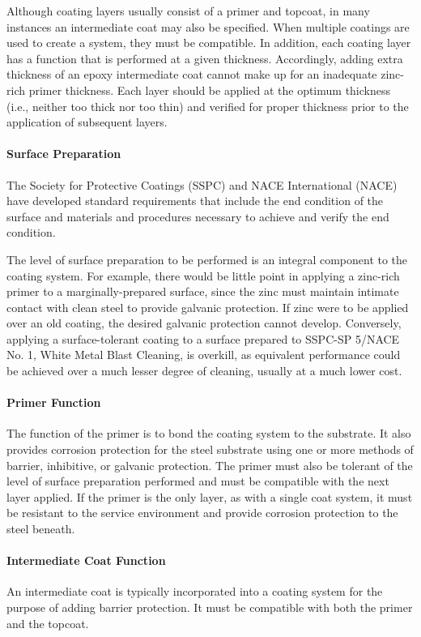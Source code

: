 Although coating layers usually consist of a primer and topcoat, in many instances an intermediate coat may also
be specified. When multiple coatings are used to create a system, they must be compatible. In addition, each coating
layer has a function that is performed at a given thickness. Accordingly, adding extra thickness of an epoxy
intermediate coat cannot make up for an inadequate zinc-rich primer thickness. Each layer should be applied at the
optimum thickness (i.e., neither too thick nor too thin) and verified for proper thickness prior to the application of
subsequent layers.

\paragraph{Surface Preparation}
The Society for Protective Coatings (SSPC) and NACE International (NACE) have developed standard
requirements that include the end condition of the surface and materials and procedures necessary to achieve and
verify the end condition.

The level of surface preparation to be performed is an integral component to the coating system. For example,
there would be little point in applying a zinc-rich primer to a marginally-prepared surface, since the zinc must
maintain intimate contact with clean steel to provide galvanic protection. If zinc were to be applied over an old
coating, the desired galvanic protection cannot develop. Conversely, applying a surface-tolerant coating to a surface
prepared to SSPC-SP 5/NACE No. 1, White Metal Blast Cleaning, is overkill, as equivalent performance could be
achieved over a much lesser degree of cleaning, usually at a much lower cost.

\paragraph{Primer Function}
The function of the primer is to bond the coating system to the substrate. It also provides corrosion protection for
the steel substrate using one or more methods of barrier, inhibitive, or galvanic protection. The primer must also be
tolerant of the level of surface preparation performed and must be compatible with the next layer applied. If the
primer is the only layer, as with a single coat system, it must be resistant to the service environment and provide
corrosion protection to the steel beneath.


\paragraph{Intermediate Coat Function}
An intermediate coat is typically incorporated into a coating system for the purpose of adding barrier protection.
It must be compatible with both the primer and the topcoat.

